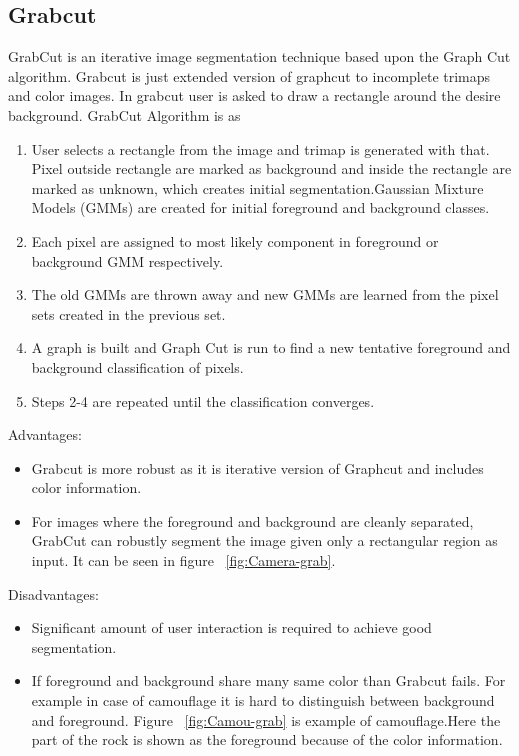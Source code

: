 \documentclass[11pt]{article}
\begin{document}
\subsection{Grabcut}

GrabCut is an iterative image segmentation technique based upon the Graph Cut algorithm. Grabcut is just extended version of graphcut to incomplete trimaps and color images. In grabcut user is asked to draw a rectangle around the desire background.
GrabCut Algorithm is as \cite{Rother:2004:GIF:1015706.1015720}
\begin{enumerate}[itemsep=0em]
\item User selects a rectangle from the image and trimap is generated with that. Pixel outside rectangle are marked as background and inside the rectangle are marked as unknown, which creates initial segmentation.Gaussian Mixture Models (GMMs) are created for initial foreground and background classes.
\item
 Each pixel are assigned to most likely component in foreground or background GMM respectively.
\item The old GMMs are thrown away and new GMMs are learned from the pixel sets created in the previous set.
\item A graph is built and Graph Cut is run to find a new tentative foreground and background classification of pixels.
\item Steps 2-4 are repeated until the classification converges.
\end{enumerate}
Advantages:

\begin{itemize}[itemsep=0em]

\item
Grabcut is more robust as it is iterative version of Graphcut and includes color information.
\item 
For images where the foreground and background are cleanly separated, GrabCut can robustly segment the image given only a rectangular region as input. It can be seen in figure ~\ref{fig:Camera-grab}. 


\end{itemize}
Disadvantages:
\begin{itemize}[itemsep=0em]
\item
Significant amount of user interaction is required to achieve good segmentation.
\item
If foreground and background share many same color than Grabcut fails. For example in case of camouflage it is hard to distinguish between background and foreground. Figure ~\ref{fig:Camou-grab} is example of camouflage.Here the part of the rock is shown as the foreground because of the color information.
\end{itemize}
\end{document}
